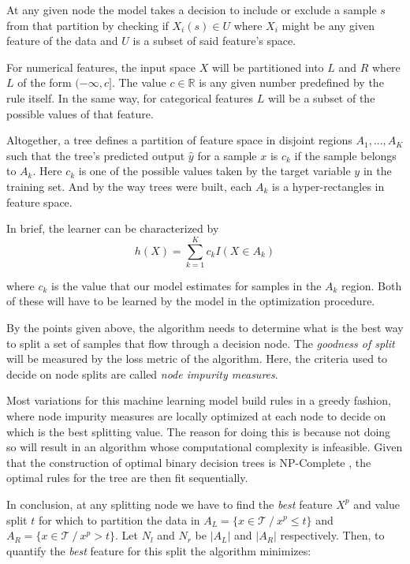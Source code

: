 At any given node the model takes a decision to include or exclude a sample $s$ from that partition by checking if $X_i(s) \in U$ where $X_i$ might be any given feature of the data and $U$ is a subset of said feature's space.

For numerical features, the input space $X$ will be partitioned into  $L$ and $R$ where $L$ of the form $(-\infty,c]$.  The value $c \in \mathbb{R}$ is any given number predefined by the rule itself.   In the same way, for categorical features $L$ will be a subset of the possible values of that feature.

Altogether, a tree defines a partition of feature space in disjoint regions $A_1,...,A_K$ such that the tree's predicted output $\hat{y}$ for a sample $x$ is $c_k$ if the sample belongs to $A_k$. Here $c_k$ is one of the possible values taken by the target variable $y$ in the training set. And by the way trees were built, each $A_k$ is a hyper-rectangles in feature space.

In brief, the learner can be characterized by
\begin{equation}
h(X) = \sum_{k=1}^K c_k I(X \in A_k)
\end{equation}\label{equation-decisionTreeModel}

where $c_k$ is the value that our model estimates for samples in the $A_k$ region. Both of these will have to be learned by the model in the optimization procedure. %

By the points given above, the algorithm needs to determine what is the best way to split a set of samples that flow through a decision node. The \textit{goodness of split} will be measured by the loss metric of the algorithm. Here, the criteria used to decide on node splits are called \textit{node impurity measures}.

Most variations for this machine learning model build rules in a greedy fashion, where node impurity measures are locally optimized at each node to decide on which is the best splitting value. The reason for doing this is because not doing so will result in an algorithm whose computational complexity is infeasible. Given that the construction of optimal binary decision trees is NP-Complete \textcite{decisionTreesNP}, the optimal rules for the tree are then fit sequentially.

In conclusion, at any splitting node we have to find the \textit{best} feature $X^p$ and value split $t$ for which to partition the data in
$A_L = \{x \in \mathcal{T} \  / \ x^p \leq t \} $ and $A_R = \{x \in \mathcal{T}\  / \ x^p> t \} $. Let $N_l$ and $N_r$ be $|A_L|$ and $|A_R|$ respectively. Then, to quantify the \textit{best} feature for this split the algorithm minimizes:

